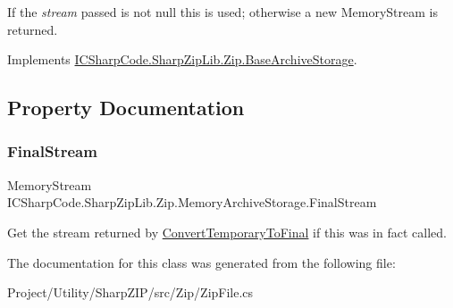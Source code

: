 If the {\itshape stream}  passed is not null this is used; otherwise a new Memory\+Stream is returned.

Implements \hyperlink{class_i_c_sharp_code_1_1_sharp_zip_lib_1_1_zip_1_1_base_archive_storage_a2e718c69eceae215d38d997e7b0d3693}{I\+C\+Sharp\+Code.\+Sharp\+Zip\+Lib.\+Zip.\+Base\+Archive\+Storage}.



\subsection{Property Documentation}
\mbox{\label{class_i_c_sharp_code_1_1_sharp_zip_lib_1_1_zip_1_1_memory_archive_storage_a499d25545be9abbe3d09a796fa628160}} 
\subsubsection{\texorpdfstring{Final\+Stream}{FinalStream}}
{\footnotesize\ttfamily Memory\+Stream I\+C\+Sharp\+Code.\+Sharp\+Zip\+Lib.\+Zip.\+Memory\+Archive\+Storage.\+Final\+Stream\hspace{0.3cm}{\ttfamily [get]}}



Get the stream returned by \hyperlink{class_i_c_sharp_code_1_1_sharp_zip_lib_1_1_zip_1_1_memory_archive_storage_a15c32e570f6ac74b5909cae3e22d84f4}{Convert\+Temporary\+To\+Final} if this was in fact called. 



The documentation for this class was generated from the following file\+:\begin{DoxyCompactItemize}
\item 
Project/\+Utility/\+Sharp\+Z\+I\+P/src/\+Zip/Zip\+File.\+cs\end{DoxyCompactItemize}
